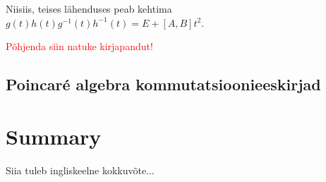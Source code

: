 \documentclass[a4paper,12pt]{article}
\theoremstyle{plain}
\theoremstyle{definition}
\numberwithin{equation}{section}
\begin{document}
Niisiis, teises lähenduses peab kehtima $g\left(t\right) h\left(t\right) g^{-1}\left(t\right) h^{-1}\left(t\right) = E + \left[A, B\right]t^2$.

\textcolor{red}{Põhjenda siin natuke kirjapandut!}

\subsection{Poincar\'e algebra kommutatsioonieeskirjad}


\newpage
\section*{Summary}
Siia tuleb ingliskeelne kokkuvõte...

\newpage
{}


\end{document}
